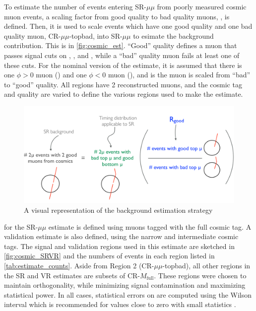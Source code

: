 To estimate the number of events entering SR-$\mu\mu$ from poorly measured cosmic muon events, a scaling factor from good quality to bad quality muons, \rgood, is defined. Then, it is used to scale events which have one good quality and one bad quality muon, CR-$\mu\mu$-topbad, into SR-$\mu\mu$ to esimate the background contribution. This is  in \autoref{fig:cosmic_est}. ``Good'' quality defines a muon that passes signal cuts on \nprecision, \nphi, and \chiCB, while a ``bad'' quality muon fails at least one of these cuts. For the nominal version of the estimate, it is assumed that there is one $\phi > 0$ muon (\mt) and one $\phi < 0$ muon (\mb), and \mt is the muon is scaled from ``bad'' to ``good'' quality. All regions have 2 reconstructed muons, and the cosmic tag and quality are varied to define the various regions used to make the estimate.

\begin{figure}[!ht]
\centering
\includegraphics[width=.8\textwidth]{figures/cosmics/background_sketch.png}
\caption{A visual representation of the background estimation strategy}
\label{fig:cosmic_est}
\end{figure}

\rgood for the SR-$\mu\mu$ estimate is defined using muons tagged with the full cosmic tag. A validation estimate is also defined, using the narrow and intermediate cosmic tags. The signal and validation regions used in this estimate are sketched in \autoref{fig:cosmic_SRVR} and the numbers of events in each region listed in \autoref{tab:estimate_counts}. Aside from Region 2 (CR-$\mu\mu$-topbad), all other regions in the SR and VR estimates are subsets of CR-$M_{\textrm{full}}$. These regions were chosen to maintain orthogonality, while minimizing signal contamination and maximizing statistical power. In all cases, statistical errors on \rgood are computed using the Wilson interval which is recommended for values close to zero with small statistics \cite{ROOTAsymmErrors}. 

